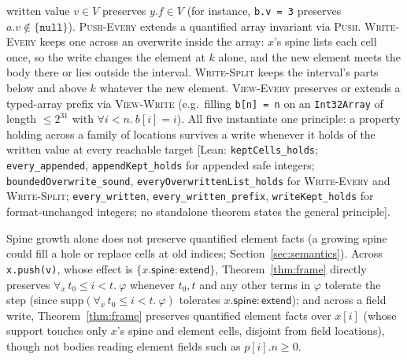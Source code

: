 \documentclass[10pt,a4paper]{article}
\theoremstyle{definition}
\theoremstyle{remark}
\newcommand{\kw}[1]{\mathsf{#1}}
\newcommand{\extend}{\kw{extend}}
\newcommand{\code}[1]{\texttt{#1}}
\newcommand{\lean}[1]{\texttt{\small #1}}
\newcommand{\status}[1]{\textsf{\small[#1]}}
\begin{document}
written value $v\in V$ preserves $y.f\in V$ (for instance, \code{b.v = 3}
preserves $a.v\notin\{\code{null}\}$). \textsc{Push-Every} extends a
quantified array invariant via \textsc{Push}. \textsc{Write-Every} keeps
one across an overwrite inside the array: $x$'s spine lists each cell
once, so the write changes the element at $k$ alone, and the new element
meets the body there or lies outside the interval. \textsc{Write-Split}
keeps the interval's parts below and above $k$ whatever the new element.
\textsc{View-Every}
preserves or extends a typed-array prefix via \textsc{View-Write} (e.g.\
filling \code{b[n] = n} on an \code{Int32Array} of length $\le 2^{31}$
with $\forall i<n.\ b[i]=i$). All five instantiate one principle: a
property holding across a family of locations survives a write whenever
it holds of the written value at every reachable target
\status{Lean: \lean{keptCells\_holds}; \lean{every\_appended}, \lean{appendKept\_holds} for appended safe integers; \lean{boundedOverwrite\_sound}, \lean{everyOverwrittenList\_holds} for \textsc{Write-Every} and \textsc{Write-Split}; \lean{every\_written}, \lean{every\_written\_prefix}, \lean{writeKept\_holds} for format-unchanged integers; no standalone theorem states the general principle}.

Spine growth alone does not preserve quantified element facts (a growing
spine could fill a hole or replace cells at old indices;
Section~\ref{sec:semantics}). Across \code{x.push(v)}, whose effect is
$\{x.\kw{spine}:\extend\}$, Theorem~\ref{thm:frame} directly preserves
$\forall_{x}\, t_0\le i<t.\ \varphi$ whenever $t_0,t$ and any other terms
in $\varphi$ tolerate the step (since $\mathrm{supp}(\forall_{x}\, t_0\le i<t.\ \varphi)$
tolerates $x.\kw{spine}:\extend$); and across
a field write, Theorem~\ref{thm:frame} preserves quantified element facts
over $x[i]$ (whose support touches only $x$'s spine and element cells,
disjoint from field locations), though not bodies reading element fields
such as $p[i].n\ge 0$.
\end{document}
